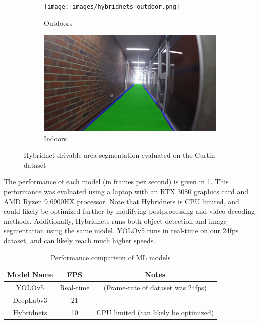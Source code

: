 \begin{figure}[b]
    \centering
    \begin{subfigure}{.48\textwidth}
        \centering
        \texttt{[image: images/hybridnets\_outdoor.png]}
        \caption{Outdoors}
    \end{subfigure}
    \quad
    \begin{subfigure}{.47\textwidth}
        \centering
        \includegraphics[width=\linewidth]{images/hybridnets_indoor.png}
        \caption{Indoors}
    \end{subfigure}
    \caption{Hybridnet drivable area segmentation evaluated on the Curtin dataset}
    \label{fig:hybridnets}
\end{figure}

The performance of each model (in frames per second) is given in \cref{table:model_fps}.
This performance was evaluated using a laptop with an RTX 3080 graphics card and AMD Ryzen 9 6900HX processor.
Note that Hybridnets is CPU limited, and could likely be optimized further by modifying postprocessing and video decoding methods.
Additionally,
Hybridnets runs both object detection and image segmentation using the same model.
YOLOv5 runs in real-time on our 24fps dataset, and can likely reach much higher speeds.

\begin{table}[H]
    \centering
    \begin{tabular}{c c c}
    \toprule
    Model Name & FPS & Notes \\
    \midrule
    YOLOv5 & Real-time & (Frame-rate of dataset was 24fps) \\
    DeepLabv3 & 21 & - \\
    Hybridnets & 10 & CPU limited (can likely be optimized) \\
    \bottomrule
    \end{tabular}
    \caption{Performance comparison of ML models}
    \label{table:model_fps}
\end{table}


